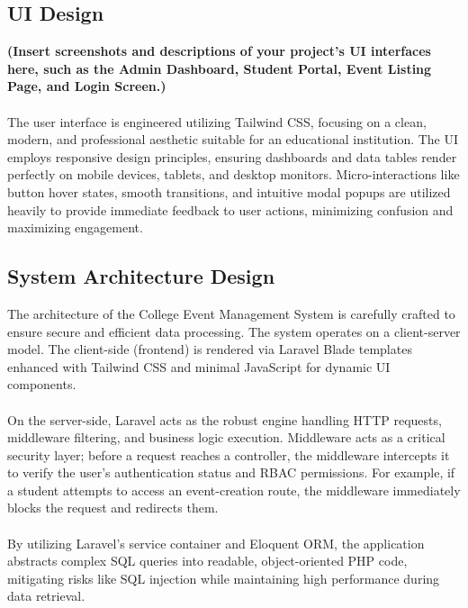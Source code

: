  \subsection{UI Design}
\textbf{(Insert screenshots and descriptions of your project's UI interfaces here, such as the Admin Dashboard, Student Portal, Event Listing Page, and Login Screen.)}
\\\\
The user interface is engineered utilizing Tailwind CSS, focusing on a clean, modern, and professional aesthetic suitable for an educational institution. The UI employs responsive design principles, ensuring dashboards and data tables render perfectly on mobile devices, tablets, and desktop monitors. Micro-interactions like button hover states, smooth transitions, and intuitive modal popups are utilized heavily to provide immediate feedback to user actions, minimizing confusion and maximizing engagement.

\subsection{System Architecture Design}
\medskip
The architecture of the College Event Management System is carefully crafted to ensure secure and efficient data processing. The system operates on a client-server model. The client-side (frontend) is rendered via Laravel Blade templates enhanced with Tailwind CSS and minimal JavaScript for dynamic UI components. \\\\
\noindent
On the server-side, Laravel acts as the robust engine handling HTTP requests, middleware filtering, and business logic execution. Middleware acts as a critical security layer; before a request reaches a controller, the middleware intercepts it to verify the user's authentication status and RBAC permissions. For example, if a student attempts to access an event-creation route, the middleware immediately blocks the request and redirects them.\\\\
\noindent
By utilizing Laravel's service container and Eloquent ORM, the application abstracts complex SQL queries into readable, object-oriented PHP code, mitigating risks like SQL injection while maintaining high performance during data retrieval.
\\\\

